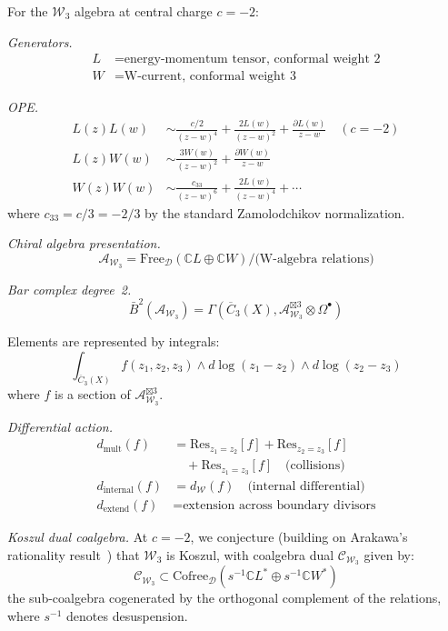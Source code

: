 \begin{example}[Explicit: \texorpdfstring{$\mathcal{W}_3$}{W_3} at \texorpdfstring{$c = -2$}{c = -2}]\label{ex:w3-c-minus-2-explicit}
For the $\mathcal{W}_3$ algebra at central charge $c = -2$:

\emph{Generators.}
\begin{align*}
L &= \text{energy-momentum tensor, conformal weight 2} \\
W &= \text{W-current, conformal weight 3}
\end{align*}

\emph{OPE.}
\begin{align*}
L(z)L(w) &\sim \frac{c/2}{(z-w)^4} + \frac{2L(w)}{(z-w)^2} + \frac{\partial L(w)}{z-w} \quad (c = -2) \\
L(z)W(w) &\sim \frac{3W(w)}{(z-w)^2} + \frac{\partial W(w)}{z-w} \\
W(z)W(w) &\sim \frac{c_{33}}{(z-w)^6} + \frac{2L(w)}{(z-w)^4} + \cdots
\end{align*}
where $c_{33} = c/3 = -2/3$ by the standard Zamolodchikov normalization.

\emph{Chiral algebra presentation.}
\[\mathcal{A}_{\mathcal{W}_3} = \text{Free}_{\mathcal{D}}(\mathbb{C}L \oplus \mathbb{C}W) 
/ \text{(W-algebra relations)}\]

\emph{Bar complex degree~2.}
\[\bar{B}^2(\mathcal{A}_{\mathcal{W}_3}) = \Gamma\left(\overline{C}_3(X), 
\mathcal{A}_{\mathcal{W}_3}^{\boxtimes 3} \otimes \Omega^\bullet\right)\]

Elements are represented by integrals:
\[\int_{\overline{C}_3(X)} f(z_1, z_2, z_3) \wedge d\log(z_1-z_2) \wedge d\log(z_2-z_3)\]
where $f$ is a section of $\mathcal{A}_{\mathcal{W}_3}^{\boxtimes 3}$.

\emph{Differential action.}
\begin{align*}
d_{\text{mult}}(f) &= \text{Res}_{z_1 = z_2}[f] + \text{Res}_{z_2 = z_3}[f] \\
&\quad + \text{Res}_{z_1 = z_3}[f] \quad \text{(collisions)} \\
d_{\text{internal}}(f) &= d_{\mathcal{W}}(f) \quad \text{(internal differential)} \\
d_{\text{extend}}(f) &= \text{extension across boundary divisors}
\end{align*}

\emph{Koszul dual coalgebra.} At $c = -2$, we conjecture (building on Arakawa's rationality result~\cite{Ara07}) that $\mathcal{W}_3$ is Koszul, with coalgebra dual $\mathcal{C}_{\mathcal{W}_3}$ given by:
\[\mathcal{C}_{\mathcal{W}_3} \subset \text{Cofree}_{\mathcal{D}}(s^{-1}\mathbb{C}L^* \oplus s^{-1}\mathbb{C}W^*)\]
the sub-coalgebra cogenerated by the orthogonal complement of the relations, where $s^{-1}$ denotes desuspension.
\end{example}


